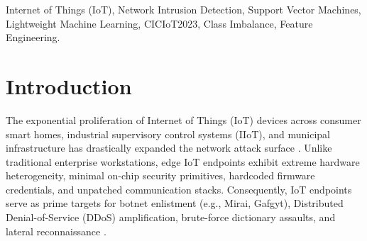 \documentclass[conference]{IEEEtran}
\begin{document}
\begin{abstract}
Evaluated on the unaugmented, naturally imbalanced CICIoT2023 test set ($N = 235,369$; $97.65\%$ attack prevalence), GuardNode achieves \textbf{90.22\% Normal Specificity} (reducing false positive rate to \textbf{9.78\%}, cutting false alarms by $51.9\%$), \textbf{71.52\% Intrusion Recall}, an \textbf{$F_1$ score of 0.8328}, and a \textbf{Balanced Accuracy of 80.87\%}, while pure ML classification executes in $0.019\text{ ms}$ on x86, $0.824\text{ ms}$ on Raspberry Pi 4, and $2.140\text{ ms}$ on an embedded 800 MHz MIPS router with $< 45\text{ MB}$ resident memory. We analyze detection performance across attack intensity tiers, document the methodological relationship between flow-record grouping and live streaming windowing, report converged baseline ablations, and demonstrate live pipeline operation on an 802.11ac Wi-Fi gateway.
\end{abstract}

\begin{IEEEkeywords}
Internet of Things (IoT), Network Intrusion Detection, Support Vector Machines, Lightweight Machine Learning, CICIoT2023, Class Imbalance, Feature Engineering.
\end{IEEEkeywords}

\section{Introduction}
The exponential proliferation of Internet of Things (IoT) devices across consumer smart homes, industrial supervisory control systems (IIoT), and municipal infrastructure has drastically expanded the network attack surface \cite{ref_iot_survey}. Unlike traditional enterprise workstations, edge IoT endpoints exhibit extreme hardware heterogeneity, minimal on-chip security primitives, hardcoded firmware credentials, and unpatched communication stacks. Consequently, IoT endpoints serve as prime targets for botnet enlistment (e.g., Mirai, Gafgyt), Distributed Denial-of-Service (DDoS) amplification, brute-force dictionary assaults, and lateral reconnaissance \cite{ref_mirai, ref_ferrag}.
\end{document}
